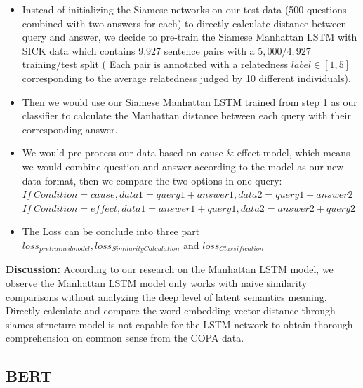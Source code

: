 \documentclass{article}
\begin{document}
\begin{itemize}
    \item Instead of initializing the Siamese networks on our test data (500 questions combined with two answers for each) to directly calculate distance between query and answer, we decide to pre-train the Siamese Manhattan LSTM with SICK data which contains 9,927 sentence pairs with a $5,000/4,927$ training/test split ( Each pair is annotated with a relatedness $label \in [1, 5]$ corresponding to the average relatedness judged by 10 different individuals).

\item Then we would use our Siamese Manhattan LSTM trained from step 1 as our classifier to calculate the Manhattan distance between each query with their corresponding answer.

\item We would pre-process our data based on cause \& effect model, which means we would combine question and answer according to the model as our new data format, then we compare the two options in one query:\\
     $If \ Condition = cause,data1 = query1 + answer1, data2 = query1 + answer 2$ \\
    $If \ Condition = effect, data1 = answer1 + query1, data2 = answer2 + query2$
\item The Loss can be conclude into three part $loss_{pretrained model}, 
    loss_{SimilarityCalculation}$ and $loss_{Classification}$
\end{itemize}

\textbf{Discussion:} According to our research on the Manhattan LSTM model, we observe the Manhattan LSTM model only works with naive similarity comparisons without analyzing the deep level of latent semantics meaning. Directly calculate and compare the word embedding vector distance through siames structure model is not capable for the LSTM network to obtain thorough comprehension on common sense from the COPA data.


\subsection{BERT}
\end{document}
